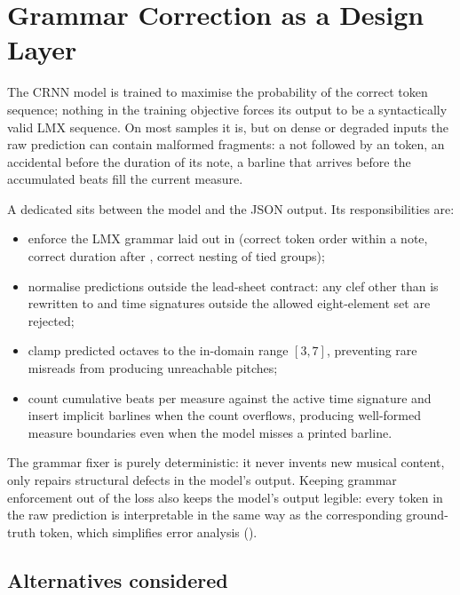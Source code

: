 \section{Grammar Correction as a Design Layer}
\label{sec:design-grammar}

The CRNN model is trained to maximise the probability of the correct
token sequence; nothing in the training objective forces its output to
be a syntactically valid LMX sequence.
On most samples it is, but on dense or degraded inputs the raw
prediction can contain malformed fragments: a  not
followed by an  token, an accidental before the duration
of its note, a barline that arrives before the accumulated beats fill
the current measure.

A dedicated  sits between the model and the
JSON output. Its responsibilities are:

\begin{itemize}
    \item enforce the LMX grammar laid out in
           (correct token order within a
          note, correct duration after , correct nesting of
          tied groups);
    \item normalise predictions outside the lead-sheet contract: any
          clef other than  is rewritten to 
          and time signatures outside the allowed eight-element set are
          rejected;
    \item clamp predicted octaves to the in-domain range $[3, 7]$,
          preventing rare misreads from producing unreachable pitches;
    \item count cumulative beats per measure against the active time
          signature and insert implicit barlines when the count
          overflows, producing well-formed measure boundaries even when
          the model misses a printed barline.
\end{itemize}

The grammar fixer is purely deterministic: it never invents new musical
content, only repairs structural defects in the model's output.
Keeping grammar enforcement out of the loss also keeps the model's
output legible: every token in the raw prediction is interpretable in
the same way as the corresponding ground-truth token, which simplifies
error analysis ().

\subsection{Alternatives considered}
\label{sec:design-grammar-alts}

